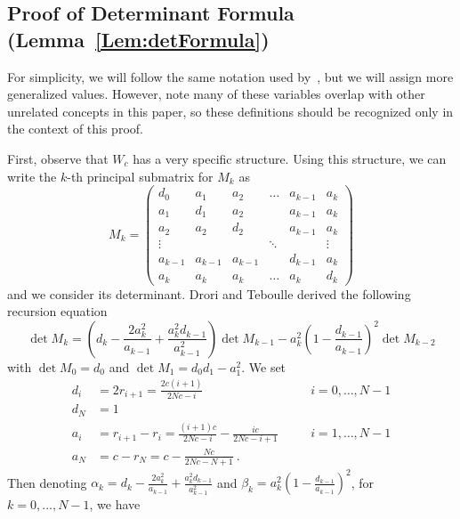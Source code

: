 \documentclass[11pt]{article}
\numberwithin{equation}{section}
\theoremstyle{definition}
\theoremstyle{definition}
\theoremstyle{definition}
\newcommand{\1}{\mathbf{1}}
\begin{document}
\subsection{Proof of Determinant Formula (Lemma~\ref{Lem:detFormula})} \label{App:ProofOfDetFormula}
    For simplicity, we will follow the same notation used by~\cite[Lemma 3.3]{FirstPEP}, but we will assign more generalized values. However, note many of these variables overlap with other unrelated concepts in this paper, so these definitions should be recognized only in the context of this proof.
    
    First, observe that $W_c$ has a very specific structure. Using this structure, we can write the $k$-th principal submatrix for $M_k$ as 
    \begin{equation*}
        M_k = \begin{pmatrix}
            d_0 & a_1 & a_2 & \dots & a_{k-1} & a_k \\
            a_1 & d_1 & a_2 & & a_{k-1} & a_k \\
            a_2& a_2 & d_2 & & a_{k-1} & a_k \\
            \vdots & & & \ddots & & \vdots \\
            a_{k-1} & a_{k-1} & a_{k-1} & & d_{k-1} & a_k \\
            a_k & a_k & a_k& \dots & a_k & d_k
        \end{pmatrix}
    \end{equation*}
    and we consider its determinant. Drori and Teboulle derived the following recursion equation
    \begin{equation}\label{Eqn:DetRecursion}
        \det M_k = \left(d_k - \frac{2a_k^2}{a_{k-1}}+\frac{a_k^2 d_{k-1}}{a_{k-1}^2}\right) \det M_{k-1} - a_k^2\left(1-\frac{d_{k-1}}{a_{k-1}}\right)^2\det M_{k-2}
    \end{equation}
    with $\det M_0 = d_0$ and $\det M_1 = d_0 d_1 - a_1^2$. We set 
    \begin{align*}
        d_i &= 2r_{i+1} = \frac{2c(i+1)}{2Nc-i} \quad && i=0,\dots,N-1 \\
        d_N &= 1 \\
        a_i &= r_{i+1}-r_i = \frac{(i+1)c}{2Nc-i} - \frac{ic}{2Nc-i+1} \quad && i=1,\dots,N-1\\
        a_N &= c-r_N = c-\frac{Nc}{2Nc-N+1} \ .
    \end{align*}
    Then denoting $\alpha_k = d_k - \frac{2a_k^2}{a_{k-1}}+\frac{a_k^2 d_{k-1}}{a_{k-1}^2}$ and $\beta_k = a_k^2\left(1-\frac{d_{k-1}}{a_{k-1}}\right)^2$, for $k=0,\dots,N-1$, we have
\end{document}
